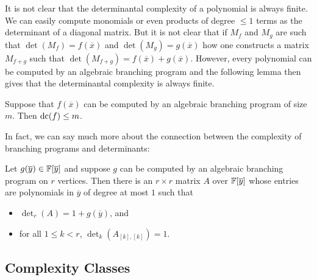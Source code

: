 \documentclass[letterpaper, 11pt]{amsart}
\newif\iffull
\begin{document}
It is not clear that the determinantal complexity of a polynomial is always finite.
We can easily compute monomials or even products of degree $\leq 1$ terms as the determinant of a diagonal matrix.
But it is not clear that if $M_f$ and $M_g$ are such that $\det(M_f) = f(\overline{x})$ and $\det(M_g) = g(\overline{x})$ how one constructs a matrix $M_{f + g}$ such that $\det(M_{f + g}) =  f(\overline{x}) + g(\overline{x})$.
However, every polynomial can be computed by an algebraic branching program and the following lemma then gives that the determinantal complexity is always finite.

\begin{lem}\label{lem:abp_det}
  Suppose that $f(\overline{x})$ can be computed by an algebraic branching program of size $m$.
  Then $\operatorname{dc}(f) \leq m$.
\end{lem}

In fact, we can say much more about the connection between the complexity of branching programs and determinants:
\begin{lem}\label{lem:ABP_to_det}
  Let $g(\overline{y}) \in \F[\overline{y}]$ and suppose $g$ can be computed by an algebraic branching program on $r$ vertices.
  Then there is an $r \times r$ matrix $A$ over $\mathbb{F}[\overline{y}]$ whose entries are polynomials in $\overline{y}$ of degree at most $1$ such that
  \begin{itemize}
    \item $\det_r(A) = 1 + g(\overline{y})$, and
    \item for all $1 \leq k < r$, $\det_k(A_{[k], [k]}) = 1$.
  \end{itemize}
\end{lem}

\iffull
Algebraic branching programs are closed under homogenization, as stated in the following lemma.

\begin{lem}[{\cite[Lemma 3.7]{AF22}}]\label{lem:homog_ABP}
  Let $g(\overline{y}) \in \F[\overline{y}]$ and suppose $g$ can be computed by an algebraic branching program on $m$ vertices.
  Let $z$ be a new indeterminate.
  Then there is a homogeneous polynomial $\widehat{g}(\overline{y}, z)$ such that $g = \widehat{g}(\overline{y}, 1)$ and $\widehat{g}$ can be computed by an algebraic branching program on $m$ vertices.
\end{lem}
\fi

\subsection{Complexity Classes}
\end{document}

